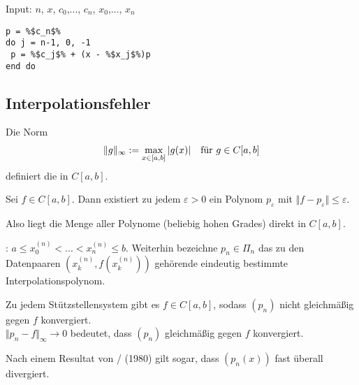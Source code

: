 \begin{algorithm}
	Input: $n$, $x$, $c_0$,..., $c_n$, $x_0$,..., $x_n$
\begin{lstlisting}
p = %$c_n$%
do j = n-1, 0, -1
 p = %$c_j$% + (x - %$x_j$%)p
end do
\end{lstlisting}
\end{algorithm}

\subsection{Interpolationsfehler}

\begin{*definition}
	Die Norm
	\begin{align}
		\Vert g\Vert_\infty := \max\limits_{x\in[a,b]}\vert g(x)\vert\quad\text{für } g\in C[a,b]\notag
	\end{align}
	definiert die  in $C[a,b]$.
\end{*definition}

\begin{proposition}
	Sei $f\in C[a,b]$. Dann existiert zu jedem $\varepsilon>0$ ein Polynom $p_\varepsilon$ mit $\Vert f-p_\varepsilon\Vert\le\varepsilon$.
\end{proposition}

Also liegt die Menge aller Polynome (beliebig hohen Grades) direkt in $C[a,b]$.

\begin{definition}[Stützstellensystem]
	: $a\le x_0^{(n)} < ... < x_n^{(n)} \le b$. Weiterhin bezeichne $p_n\in\Pi_n$ das zu den Datenpaaren $(x_k^{(n)},f(x_k^{(n)}))$ gehörende eindeutig bestimmte Interpolationspolynom.
\end{definition}

\begin{proposition}
	Zu jedem Stützstellensystem gibt es $f\in C[a,b]$, sodass $(p_n)$ nicht gleichmäßig gegen $f$ konvergiert. \\
	$\Vert p_n-f\Vert_\infty\to 0$ bedeutet, dass $(p_n)$ gleichmäßig gegen $f$ konvergiert.
\end{proposition}

Nach einem Resultat von / (1980) gilt sogar, dass $(p_n(x))$ fast überall divergiert.

